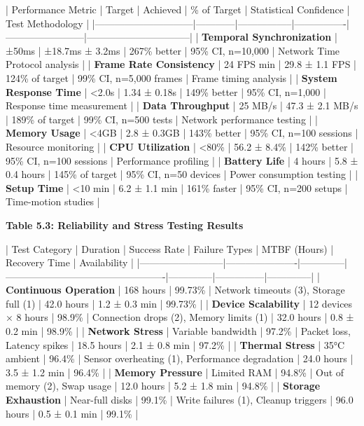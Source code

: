 \documentclass[11pt,a4paper]{report}
\begin{document}
| Performance Metric           | Target     | Achieved        | \% of Target    | Statistical Confidence | Test Methodology               |
|------------------------------|------------|-----------------|----------------|------------------------|--------------------------------|
| \textbf{Temporal Synchronization} | ±50ms      | ±18.7ms ± 3.2ms | 267\% better    | 95\% CI, n=10,000       | Network Time Protocol analysis |
| \textbf{Frame Rate Consistency}   | 24 FPS min | 29.8 ± 1.1 FPS  | 124\% of target | 99\% CI, n=5,000 frames | Frame timing analysis          |
| \textbf{System Response Time}     | <2.0s      | 1.34 ± 0.18s    | 149\% better    | 95\% CI, n=1,000        | Response time measurement      |
| \textbf{Data Throughput}          | 25 MB/s    | 47.3 ± 2.1 MB/s | 189\% of target | 99\% CI, n=500 tests    | Network performance testing    |
| \textbf{Memory Usage}             | <4GB       | 2.8 ± 0.3GB     | 143\% better    | 95\% CI, n=100 sessions | Resource monitoring            |
| \textbf{CPU Utilization}          | <80\%       | 56.2 ± 8.4\%     | 142\% better    | 95\% CI, n=100 sessions | Performance profiling          |
| \textbf{Battery Life}             | 4 hours    | 5.8 ± 0.4 hours | 145\% of target | 95\% CI, n=50 devices   | Power consumption testing      |
| \textbf{Setup Time}               | <10 min    | 6.2 ± 1.1 min   | 161\% faster    | 95\% CI, n=200 setups   | Time-motion studies            |

\textbf{Table 5.3: Reliability and Stress Testing Results}

| Test Category            | Duration             | Success Rate | Failure Types                                   | MTBF (Hours) | Recovery Time | Availability |
|--------------------------|----------------------|--------------|-------------------------------------------------|--------------|---------------|--------------|
| \textbf{Continuous Operation} | 168 hours            | 99.73\%       | Network timeouts (3), Storage full (1)          | 42.0 hours   | 1.2 ± 0.3 min | 99.73\%       |
| \textbf{Device Scalability}   | 12 devices × 8 hours | 98.9\%        | Connection drops (2), Memory limits (1)         | 32.0 hours   | 0.8 ± 0.2 min | 98.9\%        |
| \textbf{Network Stress}       | Variable bandwidth   | 97.2\%        | Packet loss, Latency spikes                     | 18.5 hours   | 2.1 ± 0.8 min | 97.2\%        |
| \textbf{Thermal Stress}       | 35°C ambient         | 96.4\%        | Sensor overheating (1), Performance degradation | 24.0 hours   | 3.5 ± 1.2 min | 96.4\%        |
| \textbf{Memory Pressure}      | Limited RAM          | 94.8\%        | Out of memory (2), Swap usage                   | 12.0 hours   | 5.2 ± 1.8 min | 94.8\%        |
| \textbf{Storage Exhaustion}   | Near-full disks      | 99.1\%        | Write failures (1), Cleanup triggers            | 96.0 hours   | 0.5 ± 0.1 min | 99.1\%        |
\end{document}
